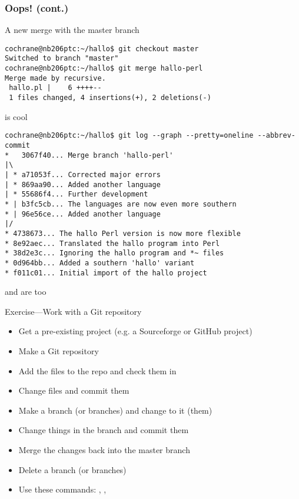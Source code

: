 \begin{frame}[fragile]
\frametitle{Oops! (cont.)}
\vspace*{-3mm}
A new merge with the master branch
\begin{lstlisting}[basicstyle=\tiny\ttfamily\color{black}]
cochrane@nb206ptc:~/hallo$ git checkout master
Switched to branch "master"
cochrane@nb206ptc:~/hallo$ git merge hallo-perl
Merge made by recursive.
 hallo.pl |    6 ++++--
 1 files changed, 4 insertions(+), 2 deletions(-)
\end{lstlisting}
\vspace*{-3mm}
 is cool
\begin{lstlisting}[basicstyle=\tiny\ttfamily\color{black}]
cochrane@nb206ptc:~/hallo$ git log --graph --pretty=oneline --abbrev-commit
*   3067f40... Merge branch 'hallo-perl'
|\  
| * a71053f... Corrected major errors
| * 869aa90... Added another language
| * 55686f4... Further development
* | b3fc5cb... The languages are now even more southern
* | 96e56ce... Added another language
|/  
* 4738673... The hallo Perl version is now more flexible
* 8e92aec... Translated the hallo program into Perl
* 38d2e3c... Ignoring the hallo program and *~ files
* 0d964bb... Added a southern 'hallo' variant
* f011c01... Initial import of the hallo project
\end{lstlisting}
\vspace*{-3mm}
 and  are too
\end{frame}

\begin{frame}{Exercise---Work with a Git repository}

\begin{itemize}
    \item Get a pre-existing project (e.g. a Sourceforge or GitHub project)
    \item Make a Git repository
    \item Add the files to the repo and check them in
    \item Change files and commit them
    \item Make a branch (or branches) and change to it (them)
    \item Change things in the branch and commit them
    \item Merge the changes back into the master branch
    \item Delete a branch (or branches)
    \item Use these commands: , , 
\end{itemize}

\end{frame}

